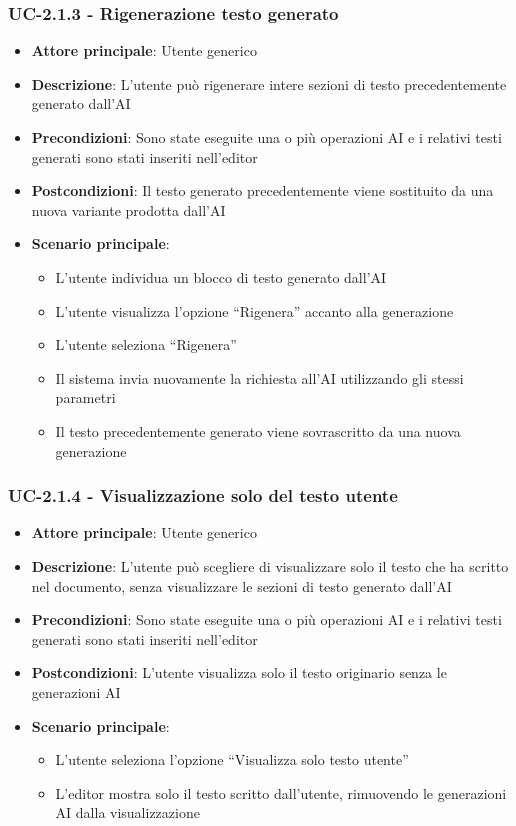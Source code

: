 \documentclass[11pt,a4paper]{article}
\begin{document}
\subsubsection{UC-2.1.3 - Rigenerazione testo generato}
\begin{itemize}
    \item \textbf{Attore principale}: Utente generico
    \item \textbf{Descrizione}: L’utente può rigenerare intere sezioni di testo precedentemente generato dall’AI
    \item \textbf{Precondizioni}: Sono state eseguite una o più operazioni AI e i relativi testi generati sono stati inseriti nell’editor
    \item \textbf{Postcondizioni}: Il testo generato precedentemente viene sostituito da una nuova variante prodotta dall'AI
    \item \textbf{Scenario principale}:
    \begin{itemize}
        \item L’utente individua un blocco di testo generato dall’AI
        \item L’utente visualizza l’opzione “Rigenera” accanto alla generazione
        \item L’utente seleziona “Rigenera”
        \item Il sistema invia nuovamente la richiesta all'AI utilizzando gli stessi parametri
        \item Il testo precedentemente generato viene sovrascritto da una nuova generazione
    \end{itemize}
\end{itemize}

\subsubsection{UC-2.1.4 - Visualizzazione solo del testo utente}
\begin{itemize}
    \item \textbf{Attore principale}: Utente generico
    \item \textbf{Descrizione}: L’utente può scegliere di visualizzare solo il testo che ha scritto nel documento, senza visualizzare le sezioni di testo generato dall’AI
    \item \textbf{Precondizioni}: Sono state eseguite una o più operazioni AI e i relativi testi generati sono stati inseriti nell’editor
    \item \textbf{Postcondizioni}: L’utente visualizza solo il testo originario senza le generazioni AI
    \item \textbf{Scenario principale}:
    \begin{itemize}
        \item L’utente seleziona l’opzione “Visualizza solo testo utente”
        \item L’editor mostra solo il testo scritto dall’utente, rimuovendo le generazioni AI dalla visualizzazione
    \end{itemize}
\end{itemize}
\end{document}
